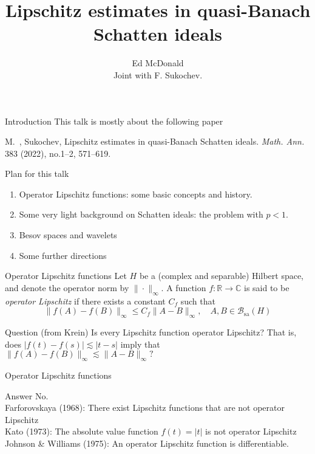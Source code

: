 \documentclass{beamer}
\newcommand\makebeamertitle{\frame{\maketitle}}%
\numberwithin{equation}{section}
\theoremstyle{plain}
\theoremstyle{plain}
\theoremstyle{definition}
\theoremstyle{plain}
\theoremstyle{plain}
\theoremstyle{definition}
\newcommand{\Rl}{\mathbb{R}}
\newcommand{\Cplx}{\mathbb{C}}
\newcommand{\Bc}{\mathcal{B}}
\newcommand{\sa}{\mathrm{sa}}
\begin{document}
\title[Lipschitz estimates for $p<1$]{Lipschitz estimates in quasi-Banach Schatten ideals}


\author[E. McDonald]{Ed McDonald\\
Joint with F. Sukochev.}



\makebeamertitle


\begin{frame}{Introduction}
This talk is mostly about the following paper
\begin{center}
M.~, Sukochev, Lipschitz estimates in quasi-Banach Schatten ideals.
\emph{Math. Ann.} 383 (2022), no.1--2, 571--619.
\end{center}
\end{frame}

\begin{frame}{Plan for this talk}
    \begin{enumerate}
        \item{} Operator Lipschitz functions: some basic concepts and history.
        \item{} Some very light background on Schatten ideals: the problem with $p<1.$
        \item{} Besov spaces and wavelets
        \item{} Some further directions
    \end{enumerate}
\end{frame}

\begin{frame}{Operator Lipschitz functions}
    Let $H$ be a (complex and separable) Hilbert space, and denote
    the operator norm by $\|\cdot\|_\infty$. A function $f:\Rl\to \Cplx$
    is said to be \emph{operator Lipschitz} if there exists a constant $C_f$ such that
    \begin{equation*}
        \|f(A)-f(B)\|_\infty \leq C_f\|A-B\|_\infty,\quad A,B\in \Bc_{\sa}(H)
    \end{equation*}
    \begin{block}{Question (from Krein)}
        Is every Lipschitz function operator Lipschitz?
        \pause
        That is, does $|f(t)-f(s)|\lesssim |t-s|$ imply that $\|f(A)-f(B)\|_{\infty} \lesssim \|A-B\|_{\infty}?$
    \end{block}
\end{frame}


\begin{frame}{Operator Lipschitz functions}
    \begin{block}{Answer}
        No.\\\pause
        Farforovskaya (1968): There exist Lipschitz functions that are not operator Lipschitz\\\pause
        Kato (1973): The absolute value function $f(t) = |t|$ is not operator Lipschitz\\\pause
        Johnson \& Williams (1975): An operator Lipschitz function is differentiable.
    \end{block}
\end{frame}
\end{document}
